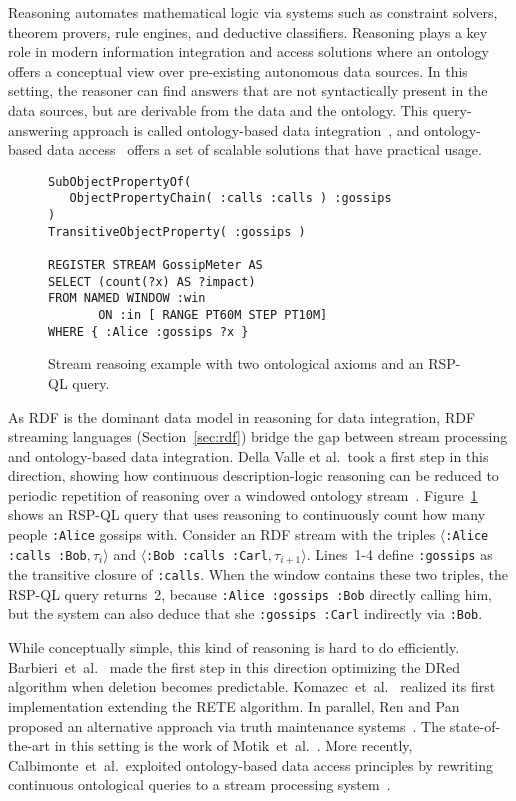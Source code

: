 Reasoning automates mathematical logic via systems such as constraint
solvers, theorem provers, rule engines, and deductive classifiers.
Reasoning plays a key role in modern information integration and
access solutions where an ontology offers a conceptual view over
pre-existing autonomous data sources. In this setting, the reasoner
can find answers that are not syntactically present in the data
sources, but are derivable from the data and the ontology.  This
query-answering approach is called ontology-based data
integration~\cite{DBLP:conf/pods/Lenzerini02}, and ontology-based data
access~\cite{DBLP:journals/jods/PoggiLCGLR08} offers a set of scalable
solutions that have practical usage.

\begin{figure}[!h]
\begin{lstlisting}[language=rsp-ql]
SubObjectPropertyOf( 
   ObjectPropertyChain( :calls :calls ) :gossips 
)
TransitiveObjectProperty( :gossips )

REGISTER STREAM GossipMeter AS
SELECT (count(?x) AS ?impact)
FROM NAMED WINDOW :win 
       ON :in [ RANGE PT60M STEP PT10M]
WHERE { :Alice :gossips ?x }
\end{lstlisting}
\vspace*{-4mm}
\caption{\label{fig:sr}Stream reasoing example with two ontological axioms and an RSP-QL query.}
\end{figure}

As RDF is the dominant data model in reasoning for data integration,
RDF streaming languages (Section~\ref{sec:rdf}) bridge the gap between
stream processing and ontology-based data integration.  Della Valle et
al.\ took a first step in this direction, showing how continuous
description-logic reasoning can be reduced to periodic repetition of
reasoning over a windowed ontology
stream~\cite{DBLP:conf/fis/ValleCBBC08}.  Figure~\ref{fig:sr} shows an
RSP-QL query that uses reasoning to continuously count how many people
\lstinline{:Alice} gossips with. Consider an RDF stream with the
triples \mbox{$\langle$\lstinline{:Alice :calls :Bob}$,\tau_i\rangle$}
and \mbox{$\langle$\lstinline{:Bob :calls :Carl}$,\tau_{i+1}\rangle$}.
\mbox{Lines 1-4} define \lstinline{:gossips} as the transitive closure
of \lstinline{:calls}. When the window contains these two triples, the
RSP-QL query returns~2, because \lstinline{:Alice :gossips :Bob}
directly calling him, but the system can also deduce that she
\lstinline{:gossips :Carl} indirectly via \lstinline{:Bob}.

While conceptually simple, this kind of reasoning is hard to do
efficiently. Barbieri~et~al.~\cite{DBLP:conf/esws/BarbieriBCVG10} made
the first step in this direction optimizing the DRed algorithm when
deletion becomes predictable.
Komazec~et~al.~\cite{DBLP:conf/debs/KomazecCF12} realized its first
implementation extending the RETE algorithm. In parallel, Ren and Pan
proposed an alternative approach via truth maintenance
systems~\cite{Ren2011}. The state-of-the-art in this setting is the
work of Motik~et~al.~\cite{DBLP:conf/aaai/MotikNPH15a}.  More
recently, Calbimonte~et~al.\ exploited ontology-based data access
principles by rewriting continuous ontological queries to a stream
processing system~\cite{DBLP:conf/esws/CalbimonteMC16}.

